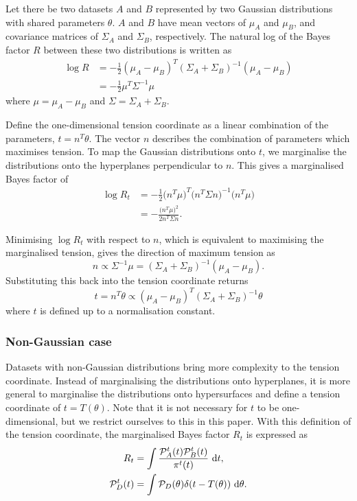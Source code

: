 \documentclass[%
 reprint,
 amsmath,amssymb,
 aps,
]{revtex4-2}
\begin{document}
Let there be two datasets $A$ and $B$ represented by two Gaussian distributions with shared parameters $\theta$. $A$ and $B$ have mean vectors of $\mu_A$ and $\mu_B$, and covariance matrices of $\Sigma_A$ and $\Sigma_B$, respectively. The natural log of the Bayes factor $R$ between these two distributions is written as \cite{Handley2019}
\begin{align}
    \log R &= - \frac{1}{2} (\mu_A - \mu_B)^T (\Sigma_A + \Sigma_B)^{-1} (\mu_A - \mu_B) \\
    &= - \frac{1}{2} \mu^T \Sigma^{-1} \mu
\end{align}
where $\mu = \mu_A - \mu_B$ and $\Sigma = \Sigma_A + \Sigma_B$.

Define the one-dimensional tension coordinate as a linear combination of the parameters, $t = n^T \theta$. The vector $n$ describes the combination of parameters which maximises tension. To map the Gaussian distributions onto $t$, we marginalise the distributions onto the hyperplanes perpendicular to $n$. This gives a marginalised Bayes factor of
\begin{align}
    \log R_t &= -\frac{1}{2} \big( n^T \mu \big)^T \big( n^T \Sigma n \big)^{-1} \big( n^T \mu \big) \\
    &= -\frac{\big( n^T \mu \big)^2}{2 n^T \Sigma n}.
\end{align}

Minimising $\log R_t$ with respect to $n$, which is equivalent to maximising the marginalised tension, gives the direction of maximum tension as
\begin{equation}
    n \propto \Sigma^{-1} \mu = (\Sigma_A + \Sigma_B)^{-1} (\mu_A - \mu_B).
\end{equation}
Substituting this back into the tension coordinate returns
\begin{equation}
    t = n^T \theta \propto (\mu_A - \mu_B)^T (\Sigma_A + \Sigma_B)^{-1} \theta
\end{equation}
where $t$ is defined up to a normalisation constant.

\subsubsection{Non-Gaussian case} \label{non_gaussian}

Datasets with non-Gaussian distributions bring more complexity to the tension coordinate. Instead of marginalising the distributions onto hyperplanes, it is more general to marginalise the distributions onto hypersurfaces and define a tension coordinate of $t = T(\theta)$. Note that it is not necessary for $t$ to be one-dimensional, but we restrict ourselves to this in this paper. With this definition of the tension coordinate, the marginalised Bayes factor $R_t$ is expressed as
\begin{align} \label{margin_R}
    R_t &= \int \frac{\mathcal{P}_A^{t}(t) \mathcal{P}_B^{t}(t)}{\pi^{t}(t)} \ \textrm{d}t, \\
    \mathcal{P}_D^{t}(t) &= \int \mathcal{P}_D(\theta) \delta(t - T(\theta)) \ \rm{d}\theta.
\end{align}
\end{document}
